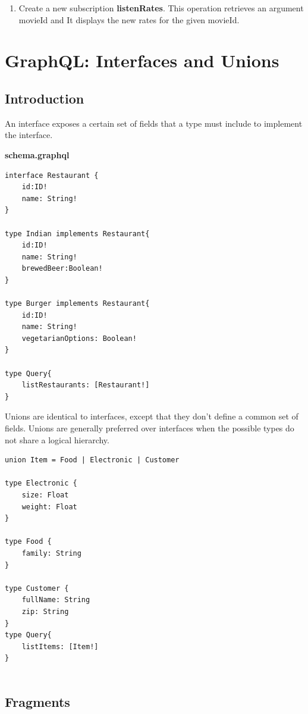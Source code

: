 \documentclass[]{book}
\providecommand{\tightlist}{%
  \setlength{\itemsep}{0pt}\setlength{\parskip}{0pt}}
\begin{document}
\begin{enumerate}
\def\labelenumi{\arabic{enumi}.}
\setcounter{enumi}{4}
\tightlist
\item
  Create a new subscription \textbf{listenRates}. This operation
  retrieves an argument movieId and It displays the new rates for the
  given movieId.
\end{enumerate}

\chapter{GraphQL: Interfaces and
Unions}\label{graphql-interfaces-and-unions}

\section{Introduction}\label{introduction-3}

An interface exposes a certain set of fields that a type must include to
implement the interface.

\textbf{schema.graphql}

\begin{verbatim}
interface Restaurant {
    id:ID!
    name: String!
}

type Indian implements Restaurant{
    id:ID!
    name: String!
    brewedBeer:Boolean!
}

type Burger implements Restaurant{
    id:ID!
    name: String!
    vegetarianOptions: Boolean!
}

type Query{
    listRestaurants: [Restaurant!]
}
\end{verbatim}

Unions are identical to interfaces, except that they don't define a
common set of fields. Unions are generally preferred over interfaces
when the possible types do not share a logical hierarchy.

\begin{verbatim}
union Item = Food | Electronic | Customer

type Electronic {
    size: Float
    weight: Float
}

type Food {
    family: String
}

type Customer {
    fullName: String
    zip: String
}
type Query{
    listItems: [Item!]
}
 
\end{verbatim}

\section{Fragments}\label{fragments}
\end{document}
